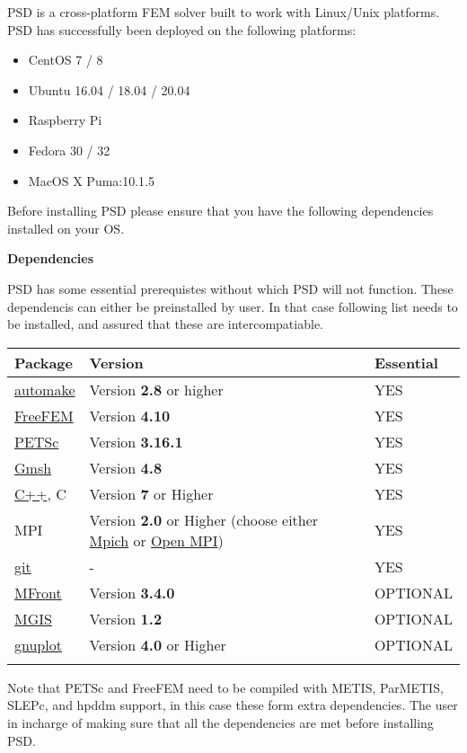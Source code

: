 PSD is a cross-platform FEM solver built to work with Linux/Unix
platforms. PSD has successfully been deployed on the following
platforms:

\begin{itemize}
\tightlist
\item
  CentOS 7 / 8
\item
  Ubuntu 16.04 / 18.04 / 20.04
\item
  Raspberry Pi
\item
  Fedora 30 / 32
\item
  MacOS X Puma:10.1.5
\end{itemize}

Before installing PSD please ensure that you have the following
dependencies installed on your OS.

\textbf{Dependencies}

PSD has some essential prerequistes without which PSD will not function.
These dependencis can either be preinstalled by user. In that case
following list needs to be installed, and assured that these are
intercompatiable.

\begin{longtable}[]{@{}lll@{}}
\toprule
Package & Version & Essential\tabularnewline
\midrule
\endhead
\href{https://www.gnu.org/software/automake/}{automake} & Version
\textbf{2.8} or higher & YES\tabularnewline
\href{https://freefem.org/}{FreeFEM} & Version \textbf{4.10} &
YES\tabularnewline
\href{https://www.mcs.anl.gov/petsc/}{PETSc} & Version \textbf{3.16.1} &
YES\tabularnewline
\href{http://gmsh.info/}{Gmsh} & Version \textbf{4.8} &
YES\tabularnewline
\href{http://www.cplusplus.com/}{C++}, C & Version \textbf{7} or Higher
& YES\tabularnewline
MPI & Version \textbf{2.0} or Higher (choose either
\href{https://www.mpich.org/}{Mpich} or
\href{https://www.open-mpi.org/}{Open MPI}) & YES\tabularnewline
\href{https://git-scm.com/}{git} & - & YES\tabularnewline
\href{http://tfel.sourceforge.net/}{MFront} & Version \textbf{3.4.0} &
OPTIONAL\tabularnewline
\href{https://thelfer.github.io/mgis/web/bindings-cxx.html}{MGIS} &
Version \textbf{1.2} & OPTIONAL\tabularnewline
\href{http://www.gnuplot.info/}{gnuplot} & Version \textbf{4.0} or
Higher & OPTIONAL\tabularnewline
& &\tabularnewline
\bottomrule
\end{longtable}

Note that PETSc and FreeFEM need to be compiled with METIS, ParMETIS,
SLEPc, and hpddm support, in this case these form extra dependencies.
The user in incharge of making sure that all the dependencies are met
before installing PSD.


